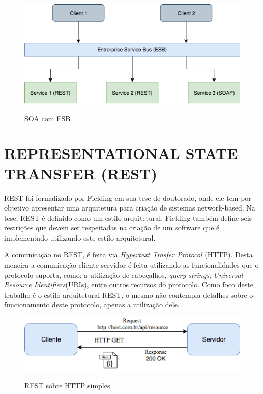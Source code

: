 \begin{figure}[!htb]
  \centering
  \caption{SOA com ESB}
  \includegraphics[width=1\textwidth]{./dados/figuras/SOA.png}
  \label{fig:soaesb}
\end{figure}

\section{REPRESENTATIONAL STATE TRANSFER (REST)}
REST foi formalizado por Fielding \cite{fielding} em sua tese de doutorado, onde ele tem por 
objetivo apresentar uma arquitetura para criação de sistemas network-based. 
Na tese, REST é definido como um estilo arquitetural. Fielding também define seis restrições que 
devem ser respeitadas na criação de um software que é implementado utilizando este estilo arquitetural. 

A comunicação no REST, é feita via \textit{Hypertext Trasfer Protocol} (HTTP). Desta meneira
a comunicação cliente-servidor é feita utilizando as funcionalidades que o protocolo suporta,
como: a utilização de cabeçalhos, \textit{query-strings}, \textit{Universal Resource Identifiers}(URIs),
entre outros recursos do protocolo. Como foco deste trabalho é o estilo arquitetural REST, 
o mesmo não contempla detalhes sobre o funcionamento deste protocolo, apenas a utilização dele.

\begin{figure}[!htb]
  \centering
  \caption{REST sobre HTTP simples}
  \includegraphics[width=1\textwidth]{./dados/figuras/rest-1.png}
  \label{fig:rest1}
\end{figure}

